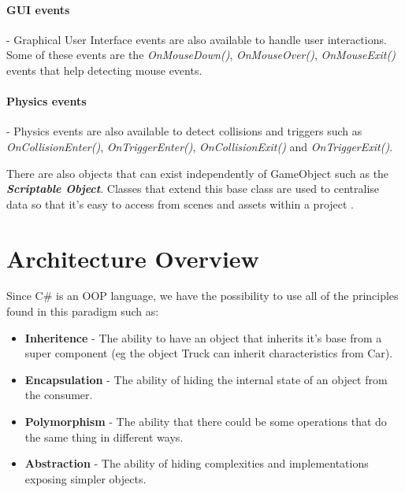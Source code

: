 \paragraph{GUI events} - Graphical User Interface events are also available to handle user interactions. Some of these events are the \textit{OnMouseDown()}, \textit{OnMouseOver()}, \textit{OnMouseExit()} events that help detecting mouse events.

\paragraph{Physics events} - Physics events are also available to detect collisions and triggers such as \textit{OnCollisionEnter()}, \textit{OnTriggerEnter()}, \textit{OnCollisionExit()} and \textit{OnTriggerExit()}.


There are also objects that can exist independently of GameObject such as the \textbf{\textit{Scriptable Object}}. Classes that extend this base class are used to centralise data so that it's easy to access from scenes and assets within a project \cite{unityDocScriptableObj}.



\newpage

\section{Architecture Overview}
Since C\# is an OOP language, we have the possibility to use all of the principles found in this paradigm such as:

\begin{itemize}
    \item \textbf{Inheritence} - The ability to have an object that inherits it's base from a super component (eg the object Truck can inherit characteristics from Car).
    \item \textbf{Encapsulation} - The ability of hiding the internal state of an object from the consumer.
    \item \textbf{Polymorphism} - The ability that there could be some operations that do the same thing in different ways.
    \item \textbf{Abstraction} - The ability of hiding complexities and implementations exposing simpler objects.
\end{itemize}

